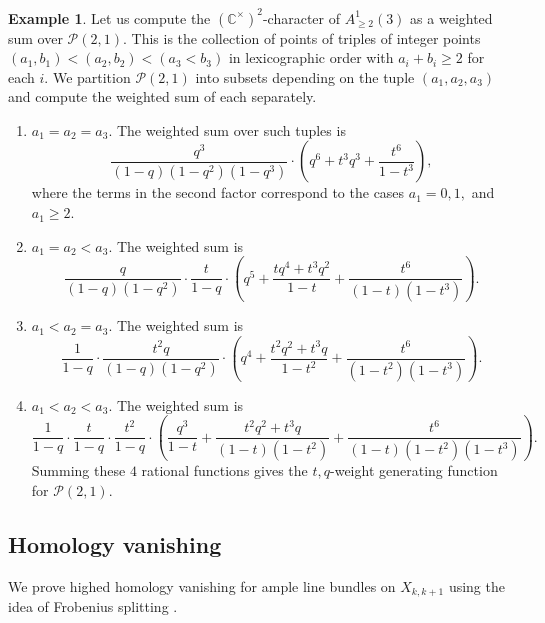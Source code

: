 \documentclass[12pt]{amsart}
\newcommand{\C}{\mathbb{C}}
\numberwithin{equation}{section}
\theoremstyle{definition}
\newtheorem{example}[theorem]{Example}
\begin{document}
\begin{example}
\label{ex:weightedcount}
    Let us compute the $(\C^{\times})^2$-character of $A^1_{\geq 2}(3)$ as a weighted sum over $\mathcal{P}(2,1)$. This is the collection of points of triples of integer points $(a_1,b_1)<(a_2,b_2)<(a_3<b_3)$ in lexicographic order with $a_i+b_i\geq 2$ for each $i$. We partition $\mathcal{P}(2,1)$ into subsets depending on the tuple $(a_1,a_2,a_3)$ and compute the weighted sum of each separately.
    \begin{enumerate}
        \item $a_1 = a_2 = a_3$. The weighted sum over such tuples is
        \[ \frac{q^3}{(1-q)(1-q^2)(1-q^3)}\cdot \left( q^6+t^3 q^3+\frac{t^6}{1-t^3} \right), \]
        where the terms in the second factor correspond to the cases $a_1 = 0,1,$ and $a_1\geq 2$.
        \item $a_1=a_2<a_3$. The weighted sum is
        \[ \frac{q}{(1-q)(1-q^2)}\cdot \frac{t}{1-q}\cdot \left( q^5+\frac{tq^4+t^3 q^2}{1-t} + \frac{t^6}{(1-t)(1-t^3)} \right). \]
        \item $a_1<a_2=a_3$. The weighted sum is
        \[ \frac{1}{1-q}\cdot \frac{t^2q}{(1-q)(1-q^2)}\cdot \left( q^4+\frac{t^2q^2+t^3 q}{1-t^2} + \frac{t^6}{(1-t^2)(1-t^3)} \right). \]
        \item $a_1<a_2<a_3$. The weighted sum is
        \[ \frac{1}{1-q}\cdot \frac{t}{1-q}\cdot \frac{t^2}{1-q}\cdot \left( \frac{q^3}{1-t}+\frac{t^2q^2+t^3q}{(1-t)(1-t^2)} + \frac{t^6}{(1-t)(1-t^2)(1-t^3)} \right). \]
        Summing these $4$ rational functions gives the $t,q$-weight generating function for $\mathcal{P}(2,1)$.   
    \end{enumerate}
\end{example}

\subsection{Homology vanishing}

We prove highed homology vanishing for ample line bundles on $X_{k,k+1}$ using the idea of Frobenius splitting \cite{FrobBook}.
\end{document}
